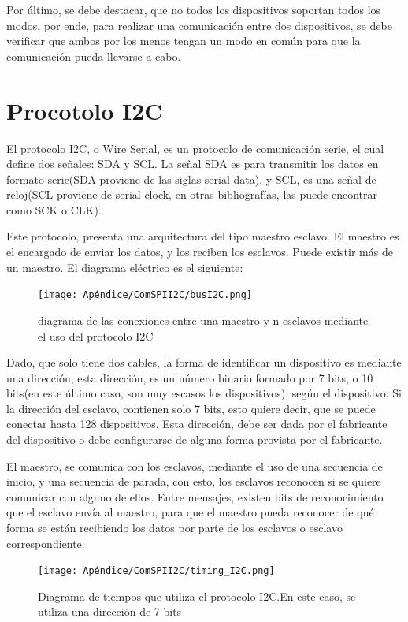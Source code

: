 Por último, se debe destacar, que no todos los dispositivos soportan todos los modos, por ende, para realizar una comunicación entre dos dispositivos, se debe verificar que ambos por los menos tengan un modo en común para que la comunicación pueda llevarse a cabo. 



\section{Procotolo I2C}

El protocolo I2C, o Wire Serial, es un protocolo de comunicación serie, el cual define dos señales: SDA y SCL. La señal SDA es para transmitir los datos en formato serie(SDA proviene de las siglas serial data), y SCL, es una señal de reloj(SCL proviene de serial clock, en otras bibliografías, las puede encontrar como SCK o CLK). 

Este protocolo, presenta una arquitectura del tipo maestro esclavo. El maestro es el encargado de enviar los datos, y los reciben los esclavos. Puede existir más de un maestro. El diagrama eléctrico es el siguiente: 

\begin{figure}[ht]
	\texttt{[image: Apéndice/ComSPII2C/busI2C.png]}
	\caption{diagrama de las conexiones entre una maestro y n esclavos mediante el uso del protocolo I2C} 
	\label{fig:busI2C}
\end{figure}

Dado, que solo tiene dos cables, la forma de identificar un dispositivo es mediante una dirección, esta dirección, es un número binario formado por 7 bits, o 10 bits(en este último caso, son muy escasos los dispositivos), según el dispositivo. Si la dirección del esclavo, contienen solo 7 bits, esto quiere decir, que se puede conectar hasta 128 dispositivos. Esta dirección, debe ser dada por el fabricante del dispositivo o debe configurarse de alguna forma provista por el fabricante.  

El maestro, se comunica con los esclavos, mediante el uso de una secuencia de inicio, y una secuencia de parada, con esto, los esclavos reconocen si se quiere comunicar con alguno de ellos. Entre mensajes, existen bits de reconocimiento que el esclavo envía al maestro, para que el maestro pueda reconocer de qué forma se están recibiendo los datos por parte de los esclavos o esclavo correspondiente. 

\begin{figure}[ht]
	\texttt{[image: Apéndice/ComSPII2C/timing\_I2C.png]}
	\caption{Diagrama de tiempos que utiliza el protocolo I2C.En este caso, se utiliza una dirección de 7 bits}
	\label{fig:timing_I2C}
\end{figure}

